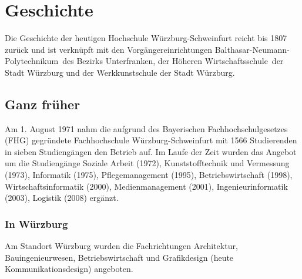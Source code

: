 

\ihead{}
\chead{}
\ohead{\leftmark}

\ifoot{}
\cfoot{\pagemark}
\ofoot{}

\chapter{Geschichte}
\label{21_00_00_00_00_00_00_00_00_00}

\thispagestyle{plain}



Die Geschichte der heutigen Hochschule Würzburg-Schweinfurt reicht bis 1807 zurück und ist verknüpft mit den Vorgängereinrichtungen \glqq Balthasar-Neumann-Polytechnikum\grqq~des Bezirks Unterfranken, der \glqq Höheren Wirtschaftsschule\grqq~der Stadt Würzburg und der Werkkunstschule der Stadt Würzburg.

\vskip 10mm

\section{Ganz früher}
\label{21_01_00_00_00_00_00_00_00_00}

Am 1. August 1971 nahm die aufgrund des Bayerischen Fachhochschulgesetzes (FHG) gegründete Fachhochschule Würzburg-Schweinfurt mit 1566 Studierenden in sieben Studiengängen den Betrieb auf. Im Laufe der Zeit wurden das Angebot um die Studiengänge Soziale Arbeit (1972), Kunststofftechnik und Vermessung (1973), Informatik (1975), Pflegemanagement (1995), Betriebswirtschaft (1998), Wirtschaftsinformatik (2000), Medienmanagement (2001), Ingenieurinformatik (2003), Logistik (2008) ergänzt.

\vskip 10mm

\subsection{In Würzburg}
\label{21_01_01_00_00_00_00_00_00_00}
Am Standort Würzburg wurden die Fachrichtungen Architektur, Bauingenieurwesen, Betriebswirtschaft und Grafikdesign (heute Kommunikationsdesign) angeboten.

